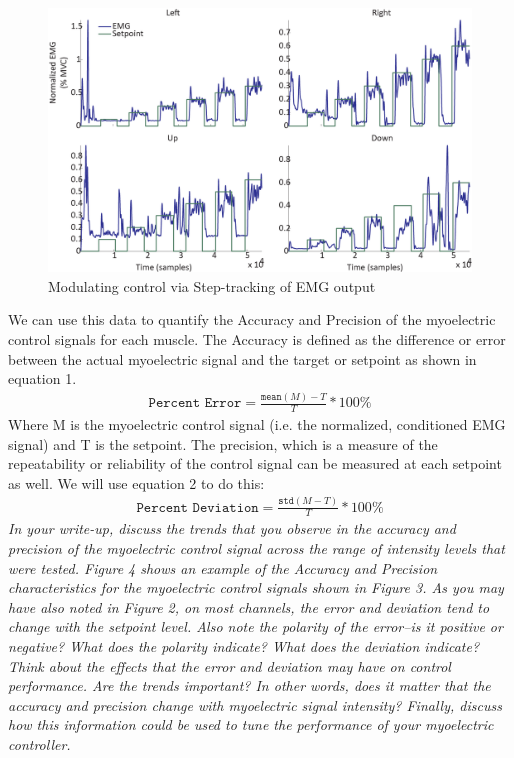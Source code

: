 \documentclass[10pt,oneside,a4paper]{article}
\begin{document}
\begin{figure}[H]
\centering
\includegraphics[width=\textwidth]{fig3.png}
\caption{Modulating control via Step-tracking of EMG output}
\end{figure}
We can use this data to quantify the Accuracy and Precision of the myoelectric control signals for each muscle. The Accuracy is defined as the difference or error between the actual myoelectric signal and the target or setpoint as shown in equation 1.
\begin{align}
\texttt{Percent Error} = \frac{\texttt{mean}(M)-T}{T} * 100\%
\end{align}
Where M is the myoelectric control signal (i.e. the normalized, conditioned EMG signal) and T is the setpoint. The precision, which is a measure of the repeatability or reliability of the control signal can be measured at each setpoint as well. We will use equation 2 to do this:
\begin{align}
\texttt{Percent Deviation} = \frac{\texttt{std}(M-T)}{T} * 100\%
\end{align}
\textit{In your write-up, discuss the trends that you observe in the accuracy and precision of the myoelectric control signal across the range of intensity levels that were tested. Figure 4 shows an example of the Accuracy and Precision characteristics for the myoelectric control signals shown in Figure 3. As you may have also noted in Figure 2, on most channels, the error and deviation tend to change with the setpoint level. Also note the polarity of the error--is it positive or negative? What does the polarity indicate? What does the deviation indicate? Think about the effects that the error and deviation may have on control performance. Are the trends important? In other words, does it matter that the accuracy and precision change with myoelectric signal intensity? Finally, discuss how this information could be used to tune the performance of your myoelectric controller.}
\end{document}
